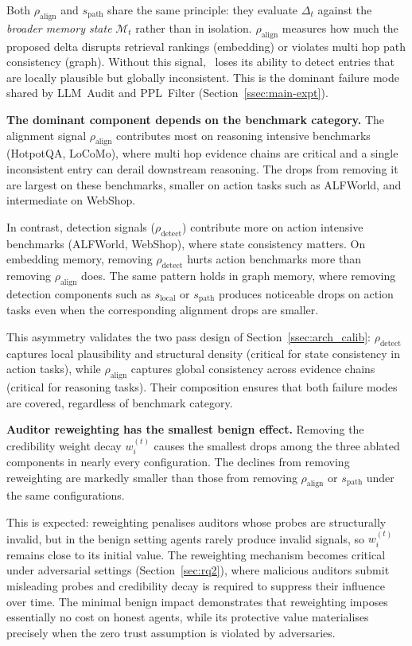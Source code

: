 Both $\rho_{\text{align}}$ and $s_{\text{path}}$ share the same principle: they evaluate $\Delta_t$ against the \emph{broader memory state} $\mathcal{M}_t$ rather than in isolation. $\rho_{\text{align}}$ measures how much the proposed delta disrupts retrieval rankings (embedding) or violates multi hop path consistency (graph). Without this signal, \system\ loses its ability to detect entries that are locally plausible but globally inconsistent. This is the dominant failure mode shared by LLM~Audit and PPL~Filter (Section~\ref{ssec:main-expt}).

\textbf{The dominant component depends on the benchmark category.}
The alignment signal $\rho_{\text{align}}$ contributes most on reasoning intensive benchmarks (HotpotQA, LoCoMo), where multi hop evidence chains are critical and a single inconsistent entry can derail downstream reasoning. The drops from removing it are largest on these benchmarks, smaller on action tasks such as ALFWorld, and intermediate on WebShop.

In contrast, detection signals ($\rho_{\text{detect}}$) contribute more on action intensive benchmarks (ALFWorld, WebShop), where state consistency matters. On embedding memory, removing $\rho_{\text{detect}}$ hurts action benchmarks more than removing $\rho_{\text{align}}$ does. The same pattern holds in graph memory, where removing detection components such as $s_{\text{local}}$ or $s_{\text{path}}$ produces noticeable drops on action tasks even when the corresponding alignment drops are smaller.

This asymmetry validates the two pass design of Section~\ref{ssec:arch_calib}: $\rho_{\text{detect}}$ captures local plausibility and structural density (critical for state consistency in action tasks), while $\rho_{\text{align}}$ captures global consistency across evidence chains (critical for reasoning tasks). Their composition ensures that both failure modes are covered, regardless of benchmark category.

\textbf{Auditor reweighting has the smallest benign effect.}
Removing the credibility weight decay $w_i^{(t)}$ causes the smallest drops among the three ablated components in nearly every configuration. The declines from removing reweighting are markedly smaller than those from removing $\rho_{\text{align}}$ or $s_{\text{path}}$ under the same configurations.

This is expected: reweighting penalises auditors whose probes are structurally invalid, but in the benign setting agents rarely produce invalid signals, so $w_i^{(t)}$ remains close to its initial value. The reweighting mechanism becomes critical under adversarial settings (Section~\ref{sec:rq2}), where malicious auditors submit misleading probes and credibility decay is required to suppress their influence over time. The minimal benign impact demonstrates that reweighting imposes essentially no cost on honest agents, while its protective value materialises precisely when the zero trust assumption is violated by adversaries.

